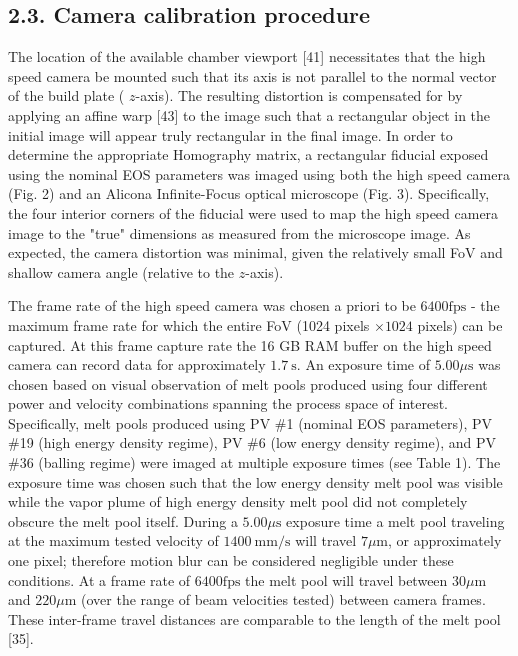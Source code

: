 \documentclass[10pt]{article}
\begin{document}
\subsection*{2.3. Camera calibration procedure}
The location of the available chamber viewport [41] necessitates that the high speed camera be mounted such that its axis is not parallel to the normal vector of the build plate ( $z$-axis). The resulting distortion is compensated for by applying an affine warp [43] to the image such that a rectangular object in the initial image will appear truly rectangular in the final image. In order to determine the appropriate Homography matrix, a rectangular fiducial exposed using the nominal EOS parameters was imaged using both the high speed camera (Fig. 2) and an Alicona Infinite-Focus optical microscope (Fig. 3). Specifically, the four interior corners of the fiducial were used to map the high speed camera image to the "true" dimensions as measured from the microscope image. As expected, the camera distortion was minimal, given the relatively small FoV and shallow camera angle (relative to the $z$-axis).

The frame rate of the high speed camera was chosen a priori to be $6400 \mathrm{fps}$ - the maximum frame rate for which the entire FoV (1024 pixels $\times 1024$ pixels) can be captured. At this frame capture rate the 16 GB RAM buffer on the high speed camera can record data for approximately $1.7 \mathrm{~s}$. An exposure time of $5.00 \mu \mathrm{s}$ was chosen based on visual observation of melt pools produced using four different power and velocity combinations spanning the process space of interest. Specifically, melt pools produced using PV \#1 (nominal EOS parameters), PV \#19 (high energy density regime), PV \#6 (low energy density regime), and PV \#36 (balling regime) were imaged at multiple exposure times (see Table 1). The exposure time was chosen such that the low energy density melt pool was visible while the vapor plume of high energy density melt pool did not completely obscure the melt pool itself. During a $5.00 \mu \mathrm{s}$ exposure time a melt pool traveling at the maximum tested velocity of $1400 \mathrm{~mm} / \mathrm{s}$ will travel $7 \mu \mathrm{m}$, or approximately one pixel; therefore motion blur can be considered negligible under these conditions. At a frame rate of $6400 \mathrm{fps}$ the melt pool will travel between $30 \mu \mathrm{m}$ and $220 \mu \mathrm{m}$ (over the range of beam velocities tested) between camera frames. These inter-frame travel distances are comparable to the length of the melt pool [35].
\end{document}
